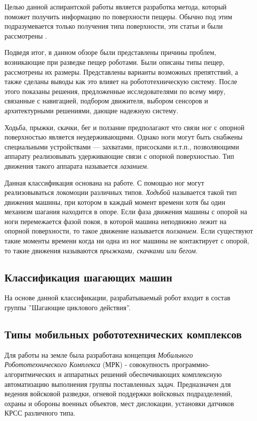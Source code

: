 Целью данной аспирантской работы является разработка метода, который поможет получить информацию по поверхности пещеры. Обычно под этим подразумевается только получения типа поверхности, эти статьи и были рассмотрены \cite{Wu2016,Wu2020,Luo2017}.

Подведя итог, в данном обзоре были представлены причины проблем, возникающие при разведке пещер роботами. Были описаны типы пещер, рассмотрены их размеры. Представлены варианты возможных препятствий, а также сделаны выводы как это влияет на робототехническую систему. После этого показаны решения, предложенные исследователями по всему миру, связанные с навигацией, подбором движителя, выбором сенсоров и архитектурными решениями, дающие надежную систему. 

Ходьба, прыжки, скачки, бег и ползание предполагают что связи ног с опорной поверхностью является неудерживающими. Однако ноги могут быть снабжены специальными устройствами — захватами, присосками и.т.п., позволяющими аппарату реализовывать удерживающие связи с опорной поверхностью. Тип движения такого аппарата называется \textit{лазанием}.

Данная классификация основана на  \cite{Maloletov2015dinamica} работе. С помощью ног могут реализовываться локомоции различных типов. \textit{Ходьбой} называется такой тип движения машины, при котором в каждый момент времени хотя бы один механизм шагания находится в опоре. Если фаза движения машины с опорой на ноги перемежается фазой покоя, в которой машина неподвижно лежит на опорной поверхности, то такое движение называется \textit{ползанием}. Если существуют такие моменты времени когда ни одна из ног машины не контактирует с опорой, то такие движения называются \textit{прыжками, скачками или бегом}.

\subsection{Классификация шагающих машин}

На основе данной классификации, разрабатываемый робот входит в состав группы ''Шагающие циклового действия''.

\subsection{Типы мобильных робототехнических комплексов}
Для работы на земле была разработана концепция \textit{Мобильного Робототехнического Комплекса} (МРК) -  совокупность программно-алгоритмических и аппаратных решений обеспечивающих комплексную автоматизацию выполнения группы поставленных задач. Предназначен для ведения войсковой разведки, огневой поддержки войсковых подразделений, охраны и обороны военных объектов, мест дислокации, установки датчиков КРСС различного типа.
